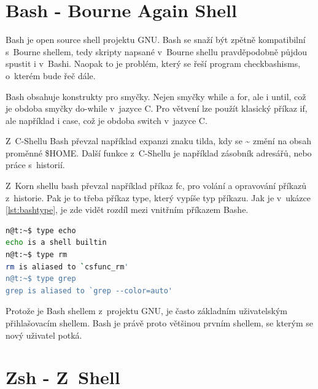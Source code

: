 \documentclass[thesis=M,czech]{FITthesis}[2012/06/26]
\begin{document}

%
%
%
\section{Bash - Bourne Again Shell}

Bash \cite{bash} \cite{learningthebashshell} \cite{unixprogrammingenvironment} je open source shell projektu GNU. Bash se snaží být zpětně kompatibilní s~Bourne shellem, tedy skripty napsané v~Bourne shellu pravděpodobně půjdou spustit i v~Bashi. Naopak to je problém, který se řeší program checkbashisms, o~kterém bude řeč dále.

Bash obsahuje konstrukty pro smyčky. Nejen smyčky while a for, ale i until, což je obdoba smyčky do-while v~jazyce C. Pro větvení lze použít klasický příkaz if, ale například i case, což je obdoba switch v~jazyce C.

Z~C-Shellu Bash převzal například expanzi znaku tilda, kdy se \textasciitilde{} změní na obsah proměnné \$HOME. Další funkce z~C-Shellu je například zásobník adresářů, nebo práce s~historií.

Z~Korn shellu bash převzal například příkaz fc, pro volání a opravování příkazů z~historie. Pak je to třeba příkaz type, který vypíše typ příkazu. Jak je v~ukázce \ref{lst:bashtype}, je zde vidět rozdíl mezi vnitřním příkazem Bashe.

\begin{minipage}{\linewidth}
\begin{lstlisting}[language=bash, caption={Příkaz type v~Bashi}, label={lst:bashtype}]
n@t:~$ type echo
echo is a shell builtin
n@t:~$ type rm
rm is aliased to `csfunc_rm'
n@t:~$ type grep
grep is aliased to `grep --color=auto'
\end{lstlisting}
\end{minipage}

Protože je Bash shellem z~projektu GNU, je často základním uživatelským přihlašovacím shellem. Bash je právě proto většinou prvním shellem, se kterým se nový uživatel potká.




%
%
%
\section{Zsh - Z~Shell}
\end{document}
